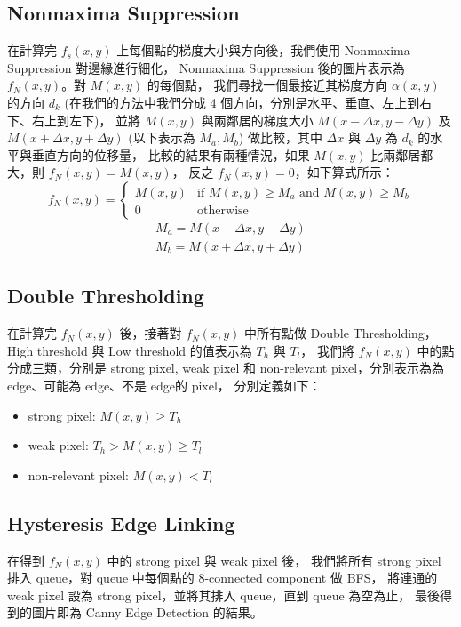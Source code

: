 \documentclass[sigconf,nonacm]{acmart}
\begin{document}
\subsection{Nonmaxima Suppression} \label{NMS}

在計算完  $f_s(x, y)$ 上每個點的梯度大小與方向後，我們使用 Nonmaxima Suppression 對邊緣進行細化，
Nonmaxima Suppression 後的圖片表示為 $f_N(x, y)$。對 $M(x, y)$ 的每個點，
我們尋找一個最接近其梯度方向 $\alpha(x, y)$ 的方向 $d_k$ 
(在我們的方法中我們分成 4 個方向，分別是水平、垂直、左上到右下、右上到左下)，
並將 $M(x, y)$ 與兩鄰居的梯度大小 $M(x-\Delta x, y-\Delta y)$ 及 $M(x+\Delta x, y+\Delta y)$ 
(以下表示為 $M_a, M_b$) 做比較，其中 $\Delta x$ 與 $\Delta y$ 為 $d_k$ 的水平與垂直方向的位移量，
比較的結果有兩種情況，如果 $M(x, y)$ 比兩鄰居都大，則 $f_N(x, y)=M(x, y)$，
反之 $f_N(x, y)=0$，如下算式所示：
$$f_N(x, y)=\begin{cases} M(x, y) & \text{if } M(x, y) \geq M_a \text{ and } M(x, y) \geq M_b
 \\ 0 & \text{otherwise} \end{cases}$$
\begin{align*}
  M_a=M(x-\Delta x, y-\Delta y) \\ M_b=M(x+\Delta x, y+\Delta y)
\end{align*}

\subsection{Double Thresholding}

在計算完 $f_N(x, y)$ 後，接著對 $f_N(x, y)$ 中所有點做 Double Thresholding，
High threshold 與 Low threshold 的值表示為 $T_h$ 與 $T_l$，
我們將 $f_N(x, y)$ 中的點分成三類，分別是 strong pixel, 
weak pixel 和 non-relevant pixel，分別表示為為 edge、可能為 edge、不是 edge的 pixel，
分別定義如下：

\begin{itemize}
  \item strong pixel: $M(x, y) \geq T_h$
  \item weak pixel: $T_h > M(x, y) \geq T_l$
  \item non-relevant pixel: $M(x, y) < T_l$
\end{itemize}

\subsection{Hysteresis Edge Linking}

在得到 $f_N(x, y)$ 中的 strong pixel 與 weak pixel 後，
我們將所有 strong pixel 排入 queue，對 queue 中每個點的 8-connected component 做 BFS，
將連通的 weak pixel 設為 strong pixel，並將其排入 queue，直到 queue 為空為止，
最後得到的圖片即為 Canny Edge Detection 的結果。
\end{document}
